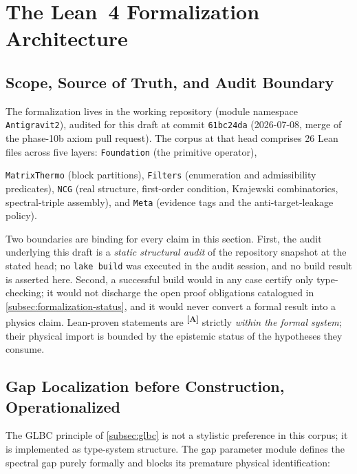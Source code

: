 \documentclass[12pt,a4paper,twoside]{article}
\theoremstyle{plain}
\theoremstyle{definition}
\theoremstyle{remark}
\newcommand{\catmark}[1]{\textsuperscript{\textsf{\textbf{[#1]}}}}
\begin{document}
\section{The Lean~4 Formalization Architecture}
\label{sec:lean-architecture}

\subsection{Scope, Source of Truth, and Audit Boundary}
\label{subsec:lean-scope}

{\sloppy The formalization lives in the working repository
 (module namespace
\texttt{Antigravit2}), audited for this draft at commit
\texttt{61bc24da} (2026-07-08, merge of the phase-10b axiom pull
request). The corpus at that head comprises 26 Lean files across five
layers: \texttt{Foundation} (the primitive operator),\par}
\texttt{MatrixThermo} (block partitions), \texttt{Filters} (enumeration
and admissibility predicates), \texttt{NCG} (real structure, first-order
condition, Krajewski combinatorics, spectral-triple assembly), and
\texttt{Meta} (evidence tags and the anti-target-leakage policy).

Two boundaries are binding for every claim in this section. First, the
audit underlying this draft is a \emph{static structural audit} of the
repository snapshot at the stated head; no \texttt{lake build} was
executed in the audit session, and no build result is asserted here.
Second, a successful build would in any case certify only type-checking;
it would not discharge the open proof obligations catalogued in
\cref{subsec:formalization-status}, and it would never convert a formal
result into a physics claim. Lean-proven statements are \catmark{A}
strictly \emph{within the formal system}; their physical import is bounded
by the epistemic status of the hypotheses they consume.

\subsection{Gap Localization before Construction, Operationalized}
\label{subsec:glbc-operational}

The GLBC principle of \cref{subsec:glbc} is not a stylistic preference in
this corpus; it is implemented as type-system structure. The gap parameter
module defines the spectral gap purely formally and blocks its premature
physical identification:
\end{document}
